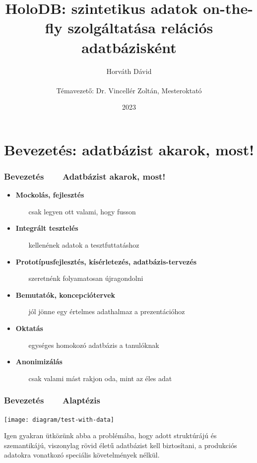 \documentclass[
]{beamer}
\title[HoloDB]{HoloDB: szintetikus adatok on-the-fly szolgáltatása relációs adatbázisként}
\author[Horváth Dávid]{Horváth Dávid \\ ~ \\ { \footnotesize Témavezető: Dr. Vincellér Zoltán, Mesteroktató }}
\institute[ELTE-IK]{ELTE Informatikai Kar, Információs Rendszerek Tanszék}
\date{2023}
\newcommand{\slidetitle}[2]{\frametitle{{\small #1 ~ \ding{226} ~ } \normalsize \textbf{#2} }}
\begin{document}
\beamertemplatenavigationsymbolsempty

\frame{\titlepage}


\section{Bevezetés: adatbázist akarok, most!}
\def\sectionshorttitle{Bevezetés}

\begin{frame}
    \slidetitle{\sectionshorttitle}{Adatbázist akarok, most!}
    
    \begin{itemize}
        \setlength\itemsep{0.7em}
        \pause \item \textbf{Mockolás, fejlesztés} \par
            ~~~ csak legyen ott valami, hogy fusson
        \pause \item \textbf{Integrált tesztelés} \par
            ~~~ kellenének adatok a tesztfuttatáshoz
        \pause \item \textbf{Prototípusfejlesztés, kísérletezés, adatbázis-tervezés} \par
            ~~~ szeretnénk folyamatosan újragondolni
        \pause \item \textbf{Bemutatók, koncepciótervek} \par
            ~~~ jól jönne egy értelmes adathalmaz a prezentációhoz
        \pause \item \textbf{Oktatás} \par
            ~~~ egységes homokozó adatbázis a tanulóknak
        \pause \item \textbf{Anonimizálás} \par
            ~~~ csak valami mást rakjon oda, mint az éles adat
    \end{itemize}
\end{frame}

\begin{frame}
    \slidetitle{\sectionshorttitle}{Alaptézis}
    
    \centering
    
    \texttt{[image: diagram/test-with-data]}
    
    \vspace{1cm}
    
    \begin{minipage}[b]{0.8\textwidth}
        \justifying
        Igen gyakran ütközünk abba a problémába,
        hogy adott struktúrájú és szemantikájú,
        viszonylag rövid életű adatbázist kell biztosítani,
        a produkciós adatokra vonatkozó speciális követelmények nélkül.
    \end{minipage}
\end{frame}
\end{document}
